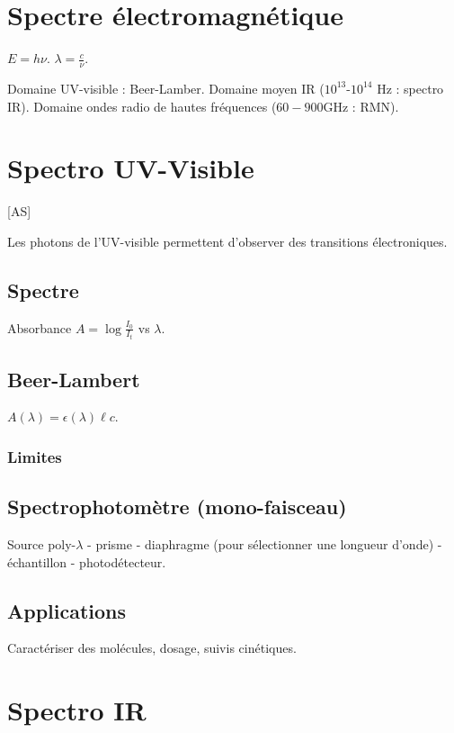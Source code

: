 \documentclass[11pt]{report}
\numberwithin{figure}{section}
\numberwithin{equation}{section}
\numberwithin{table}{section}
\newcommand{\1}{\boldsymbol{1}}
\begin{document}
\section{Spectre électromagnétique}

$E = h \nu$. $\lambda = \frac{c}{\nu}$.

Domaine UV-visible : Beer-Lamber. Domaine moyen IR ($10^13$-$10^14$ Hz : spectro IR). Domaine ondes radio de hautes fréquences ($60-900$GHz : RMN).

\section{Spectro UV-Visible}

[AS]

Les photons de l'UV-visible permettent d'observer des transitions électroniques.


\subsection{Spectre}

Absorbance $A = \log \frac{I_0}{I_t}$ vs $\lambda$. 

\subsection{Beer-Lambert}

$A(\lambda) = \epsilon(\lambda) \ell c$.

\subsubsection*{Limites}


\subsection{Spectrophotomètre (mono-faisceau)}

Source poly-$\lambda$ - prisme - diaphragme (pour sélectionner une longueur d'onde) - échantillon - photodétecteur.

\subsection{Applications}

Caractériser des molécules, dosage, suivis cinétiques.


\section{Spectro IR}
\end{document}

